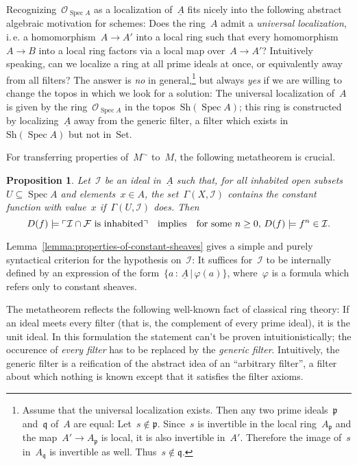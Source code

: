 \documentclass[10pt]{amsart}
\makeatletter
\theoremstyle{definition}
\theoremstyle{plain}
\newtheorem{prop}[defn]{Proposition}
\theoremstyle{remark}
\newcommand{\F}{\mathcal{F}}
\renewcommand{\O}{\mathcal{O}}
\newcommand{\I}{\mathcal{I}}
\newcommand{\ppp}{\mathfrak{p}}
\newcommand{\qqq}{\mathfrak{q}}
\newcommand{\ul}[1]{\underline{#1}}
\newcommand{\Set}{\mathrm{Set}}
\newcommand{\Sh}{\mathrm{Sh}}
\DeclareMathOperator{\Spec}{Spec}
\newcommand{\?}{\,{:}\,}
\renewcommand{\_}{\mathpunct{.}\,}
\newcommand{\speak}[1]{\ulcorner\text{\textnormal{#1}}\urcorner}
\newcommand{\ie}{i.\,e.\@\xspace}
\makeatother
\begin{document}
Recognizing~$\O_{\Spec A}$ as a localization of~$\ul{A}$ fits nicely into the
following abstract algebraic motivation for schemes: Does the ring~$A$ admit a
\emph{universal localization}, \ie a homomorphism~$A \to A'$ into a local ring
such that every homomorphism~$A \to B$ into a local ring factors via a local
map over~$A \to A'$? Intuitively speaking, can we localize a ring at all prime
ideals at once, or equivalently away from all filters? The answer is \emph{no}
in general,\footnote{Assume that the universal localization exists. Then any
two prime ideals~$\ppp$ and~$\qqq$ of~$A$ are equal: Let~$s \not\in \ppp$.
Since~$s$ is invertible in the local ring~$A_\ppp$ and the map~$A' \to A_\ppp$
is local, it is also invertible in~$A'$. Therefore the image of~$s$ in~$A_\qqq$ is
invertible as well. Thus~$s \not\in \qqq$.} but always \emph{yes} if we are
willing to change the topos in which we look for a solution: The universal
localization of~$A$ is given by the ring~$\O_{\Spec A}$ in the topos~$\Sh(\Spec
A)$; this ring is constructed by localizing~$\ul{A}$ away from the generic
filter, a filter which exists in~$\Sh(\Spec A)$ but not in~$\Set$.

For transferring properties of~$M^\sim$ to~$M$, the following metatheorem is
crucial.
\begin{prop}Let~$\I$ be an ideal in~$\ul{A}$ such that, for all inhabited
open subsets~$U \subseteq \Spec A$ and elements~$x \in A$, the set~$\Gamma(X,\I)$
contains the constant function with value~$x$ if~$\Gamma(U,\I)$ does. Then
\[ D(f) \models \speak{$\I \cap \F$ is inhabited}
  \quad\text{implies}\quad
  \text{for some~$n \geq 0$, $D(f) \models f^n \in \I$.} \]
\end{prop}

Lemma~\ref{lemma:properties-of-constant-sheaves} gives a simple and purely
syntactical criterion for the hypothesis on~$\I$: It suffices for~$\I$ to be
internally defined by an expression of the form~$\{ a\?\ul{A} \,|\, \varphi(a)
\}$, where~$\varphi$ is a formula which refers only to constant sheaves.

The metatheorem reflects the following well-known fact of classical
ring theory: If an ideal meets every filter (that is, the complement of every
prime ideal), it is the unit ideal. In this formulation the statement can't be
proven intuitionistically; the occurence of \emph{every filter} has to be
replaced by the \emph{generic filter}. Intuitively, the generic filter is a
reification of the abstract idea of an ``arbitrary filter'', a filter about
which nothing is known except that it satisfies the filter axioms.
\end{document}
